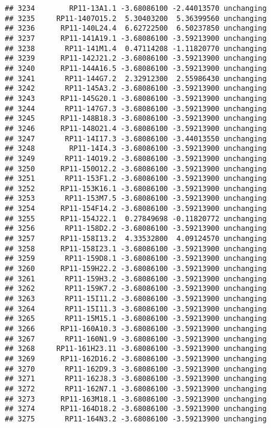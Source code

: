 \documentclass[]{article}
\begin{document}
\begin{verbatim}
## 3234        RP11-13A1.1 -3.68086100 -2.44013570 unchanging
## 3235     RP11-1407O15.2  5.30403200  5.36399560 unchanging
## 3236      RP11-140L24.4  6.62722500  6.50237850 unchanging
## 3237      RP11-141A19.1 -3.68086100 -3.59213900 unchanging
## 3238       RP11-141M1.4  0.47114208 -1.11820770 unchanging
## 3239      RP11-142J21.2 -3.68086100 -3.59213900 unchanging
## 3240      RP11-144A16.5 -3.68086100 -3.59213900 unchanging
## 3241       RP11-144G7.2  2.32912300  2.55986430 unchanging
## 3242       RP11-145A3.2 -3.68086100 -3.59213900 unchanging
## 3243      RP11-145G20.1 -3.68086100 -3.59213900 unchanging
## 3244       RP11-147G7.3 -3.68086100 -3.59213900 unchanging
## 3245      RP11-148B18.3 -3.68086100 -3.59213900 unchanging
## 3246      RP11-148O21.4 -3.68086100 -3.59213900 unchanging
## 3247       RP11-14I17.3 -3.68086100 -3.44013550 unchanging
## 3248        RP11-14I4.3 -3.68086100 -3.59213900 unchanging
## 3249       RP11-14O19.2 -3.68086100 -3.59213900 unchanging
## 3250      RP11-150O12.2 -3.68086100 -3.59213900 unchanging
## 3251       RP11-153F1.2 -3.68086100 -3.59213900 unchanging
## 3252      RP11-153K16.1 -3.68086100 -3.59213900 unchanging
## 3253       RP11-153M7.5 -3.68086100 -3.59213900 unchanging
## 3254      RP11-154F14.2 -3.68086100 -3.59213900 unchanging
## 3255      RP11-154J22.1  0.27849698 -0.11820772 unchanging
## 3256       RP11-158D2.2 -3.68086100 -3.59213900 unchanging
## 3257      RP11-158I13.2  4.33532800  4.09124570 unchanging
## 3258      RP11-158I23.1 -3.68086100 -3.59213900 unchanging
## 3259       RP11-159D8.1 -3.68086100 -3.59213900 unchanging
## 3260      RP11-159H22.2 -3.68086100 -3.59213900 unchanging
## 3261       RP11-159H3.2 -3.68086100 -3.59213900 unchanging
## 3262       RP11-159K7.2 -3.68086100 -3.59213900 unchanging
## 3263       RP11-15I11.2 -3.68086100 -3.59213900 unchanging
## 3264       RP11-15I11.3 -3.68086100 -3.59213900 unchanging
## 3265       RP11-15M15.1 -3.68086100 -3.59213900 unchanging
## 3266      RP11-160A10.3 -3.68086100 -3.59213900 unchanging
## 3267       RP11-160N1.9 -3.68086100 -3.59213900 unchanging
## 3268     RP11-161H23.11 -3.68086100 -3.59213900 unchanging
## 3269      RP11-162D16.2 -3.68086100 -3.59213900 unchanging
## 3270       RP11-162D9.3 -3.68086100 -3.59213900 unchanging
## 3271       RP11-162J8.3 -3.68086100 -3.59213900 unchanging
## 3272       RP11-162N7.1 -3.68086100 -3.59213900 unchanging
## 3273      RP11-163M18.1 -3.68086100 -3.59213900 unchanging
## 3274      RP11-164D18.2 -3.68086100 -3.59213900 unchanging
## 3275       RP11-164N3.2 -3.68086100 -3.59213900 unchanging

\end{verbatim}
\end{document}
